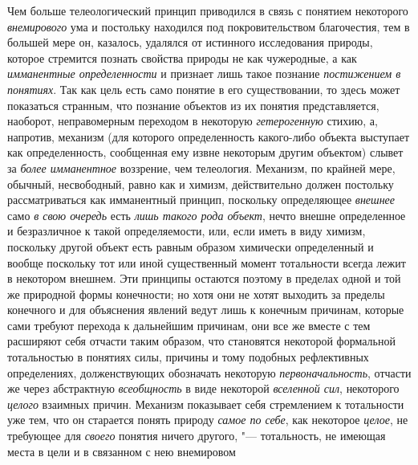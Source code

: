 Чем больше телеологический принцип приводился в связь с
понятием некоторого {\em внемирового}
ума и постольку находился под покровительством благочестия,
тем в большей мере он, казалось, удалялся от истинного исследования
природы, которое стремится познать свойства природы не как чужеродные, а
как {\em имманентные определенности}
и признает лишь такое познание
{\em постижением в понятиях}.
Так как цель есть само понятие в его существовании, то здесь
может показаться странным, что познание объектов из их понятия
представляется, наоборот, неправомерным переходом в некоторую
{\em гетерогенную}
стихию, а, напротив, механизм (для которого определенность
какого-либо объекта выступает как определенность, сообщенная ему извне
некоторым другим объектом) слывет за
{\em более имманентное}
воззрение, чем телеология. Механизм, по крайней мере,
обычный, несвободный, равно как и химизм, действительно должен постольку
рассматриваться как имманентный принцип, поскольку определяющее
{\em внешнее} само
{\em в свою очередь} есть
{\em лишь такого рода объект},
нечто внешне определенное и безразличное к такой
определяемости, или, если иметь в виду химизм, поскольку другой объект есть
равным образом химически определенный и вообще поскольку тот или иной
существенный момент тотальности всегда лежит в некотором внешнем. Эти
принципы остаются поэтому в пределах одной и той же природной формы
конечности; но хотя они не хотят выходить за пределы
конечного и для объяснения явлений ведут лишь к конечным причинам, которые
сами требуют перехода к дальнейшим причинам, они все же вместе с тем
расширяют себя отчасти таким образом, что становятся некоторой формальной
тотальностью в понятиях силы, причины и тому подобных рефлективных
определениях, долженствующих обозначать некоторую
{\em первоначальность},
отчасти же через абстрактную
{\em всеобщность} в виде
некоторой {\em вселенной сил},
некоторого {\em целого}
взаимных причин. Механизм показывает себя стремлением к
тотальности уже тем, что он старается понять природу
{\em самое по себе}, как
некоторое {\em целое}, не
требующее для {\em своего}
понятия ничего другого, "--- тотальность, не
имеющая места в цели и в связанном с нею внемировом
